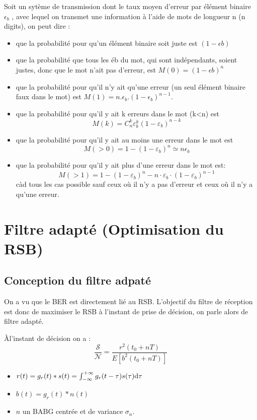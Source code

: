 \documentclass[main.tex]{subfiles}
\begin{document}
\begin{prop}
  Soit un sytème de transmission dont le taux moyen d’erreur par élément binaire $\epsilon_b$ , avec lequel on transmet une information à l’aide de mots de longueur n (n digits), on peut dire :
  \begin{itemize}
  \item   que la probabilité pour qu’un élément binaire soit juste est $(1 - \epsilon b )$
  \item que la probabilité que tous les éb du mot, qui sont indépendants, soient justes, donc que le mot n’ait pas d’erreur, est $M(0) = (1 - \epsilon b )^n$ 
  \item que la probabilité pour qu’il n’y ait qu’une erreur (un seul élément binaire faux dans le mot) est $M(1) = n.\epsilon_b .(1 -\epsilon_b)^{n-1}$.
  \item que la probabilité pour qu’il y ait k erreurs dans le mot (k<n) est 
    \[
M(k)=C_{n}^{k} \varepsilon_{b}^{k}\left(1-\varepsilon_{b}\right)^{n-k}
\]
\item que la probabilité pour qu’il y ait au moins une erreur dans le mot est
  \[
M(>0)=1-\left(1-\varepsilon_{b}\right)^{n}\simeq n\epsilon_b
\]
\item que la probabilité pour qu’il y ait plus d’une erreur dans le mot est:
  \[
M(>1)=1-\left(1-\varepsilon_{b}\right)^{n}-n \cdot \varepsilon_{b} \cdot\left(1-\varepsilon_{b}\right)^{n-1}
\]càd tous les cas possible
sauf ceux où il n’y a pas d’erreur et ceux où il n’y a qu’une erreur.
    
    
\end{itemize}
\end{prop}
\section{Filtre adapté (Optimisation du RSB)}
\subsection{Conception du filtre adpaté}

On a vu que le BER est directement lié au RSB. L'objectif du filtre de réception est donc de maximiser le RSB à l'instant de prise de décision, on parle alors de filtre adapté. 
\begin{prop}
  Àl'instant de décision on a :
  \[
    \frac{\mathcal{S}}{\mathcal{N}}= \frac{r^2(t_0+nT)}{E[b^2(t_0+nT)]}
  \]
  \begin{itemize}
  \item $r(t) = g_r(t)\ast s(t) = \int_{-\infty}^{+\infty}g_r(t-\tau)s(\tau)\mbox{d} \tau$
  \item $b(t) = g_r(t)\ast n(t) $
  \item $n$ un BABG centrée et de variance $\sigma_n$.
  \end{itemize}
\end{prop}
\end{document}
